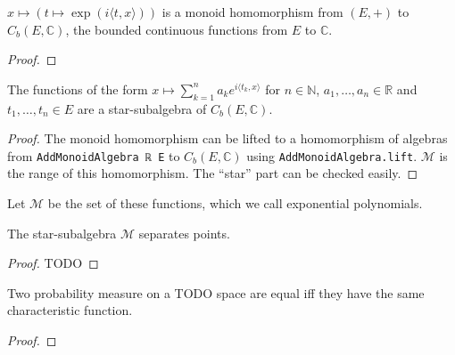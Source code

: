 \begin{lemma}\label{lem:exp_character}
$x \mapsto (t \mapsto \exp(i \langle t, x \rangle))$ is a monoid homomorphism from $(E,+)$ to $C_b(E, \mathbb{C})$, the bounded continuous functions from $E$ to $\mathbb{C}$.
\end{lemma}

\begin{proof}
\end{proof}

\begin{lemma}\label{lem:starSubalgebra_expPoly}
The functions of the form $x \mapsto \sum_{k=1}^n a_k e^{i\langle t_k, x\rangle}$ for $n \in \mathbb{N}$, $a_1, \ldots, a_n \in \mathbb{R}$ and $t_1, \ldots, t_n \in E$ are a star-subalgebra of $C_b(E, \mathbb{C})$. 
\end{lemma}

\begin{proof}
The monoid homomorphism can be lifted to a homomorphism of algebras from \texttt{AddMonoidAlgebra ℝ E} to $C_b(E, \mathbb{C})$ using \texttt{AddMonoidAlgebra.lift}. $\mathcal M$ is the range of this homomorphism. The ``star'' part can be checked easily.
\end{proof}

Let $\mathcal M$ be the set of these functions, which we call exponential polynomials.

\begin{lemma}\label{lem:separating_expPoly}
The star-subalgebra $\mathcal M$ separates points.
\end{lemma}

\begin{proof}
TODO
\end{proof}


\begin{lemma}\label{lem:ext_charFun}
Two probability measure on a TODO space are equal iff they have the same characteristic function.
\end{lemma}

\begin{proof}
\end{proof}


